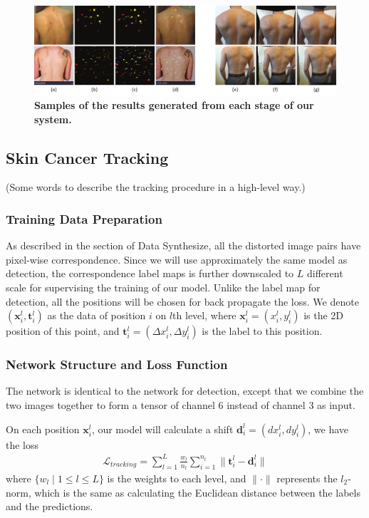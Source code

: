 \documentclass[letterpaper]{article}
\begin{document}
\begin{figure}[h!]
  \centering
  \includegraphics[width=\textwidth]{./raw_results.pdf}
  \caption{{\bf Samples of the results generated from each stage of our system.}}
  \label{fig:raw_results}
\end{figure}

\subsection{Skin Cancer Tracking}

(Some words to describe the tracking procedure in a high-level way.)

\subsubsection{Training Data Preparation}

As described in the section of Data Synthesize, all the distorted image pairs have pixel-wise correspondence. Since we will use approximately the same model as detection, the correspondence label maps is further downscaled to $L$ different scale for supervising the training of our model. Unlike the label map for detection, all the positions will be chosen for back propagate the loss. We denote $(\mathbf{x}^l_i, \mathbf{t}^l_i)$ as the data of position $i$ on $l$th level, where $\mathbf{x}^l_i = (x^l_i, y^l_i)$ is the 2D position of this point, and $\mathbf{t}^l_i = (\Delta x^l_i, \Delta y^l_i)$ is the label to this position.

\subsubsection{Network Structure and Loss Function}

The network is identical to the network for detection, except that we combine the two images together to form a tensor of channel $6$ instead of channel $3$ as input.

On each position $\mathbf{x}^l_i$, our model will calculate a shift $\mathbf{d}^l_i = (dx^l_i, dy^l_i)$, we have the loss
\begin{align}
  \mathcal{L}_{tracking} = \sum_{l=1}^L \frac{w_l}{n_l} \sum_{i=1}^{n_l}
  \lVert \mathbf{t}^l_i - \mathbf{d}^l_i \rVert
\end{align}
where $\{w_l\mid 1\le l \le L\}$ is the weights to each level, and $\lVert \cdot \rVert$ represents the $l_2$-norm, which is the same as calculating the Euclidean distance between the labels and the predictions.
\end{document}
